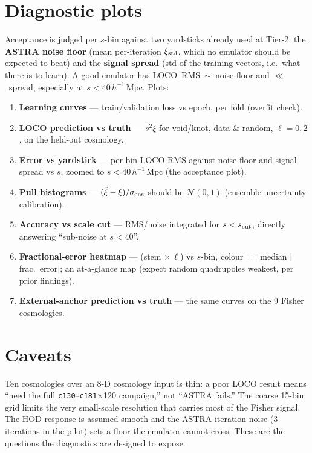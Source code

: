 \documentclass[11pt]{article}
\newcommand{\Mpch}{\,h^{-1}\,\mathrm{Mpc}}
\newcommand{\code}[1]{\texttt{#1}}
\begin{document}
\section{Diagnostic plots}
Acceptance is judged per $s$-bin against two yardsticks already used at Tier-2:
the \textbf{ASTRA noise floor} (mean per-iteration $\xi_{\rm std}$, which no
emulator should be expected to beat) and the \textbf{signal spread} (std of the
training vectors, i.e.\ what there is to learn). A good emulator has
LOCO~RMS~$\sim$~noise floor and $\ll$~spread, especially at $s<40\Mpch$. Plots:
\begin{enumerate}
\item \textbf{Learning curves} --- train/validation loss vs epoch, per fold (overfit check).
\item \textbf{LOCO prediction vs truth} --- $s^2\xi$ for void/knot, data \& random,
  $\ell=0,2$, on the held-out cosmology.
\item \textbf{Error vs yardstick} --- per-bin LOCO RMS against noise floor and
  signal spread vs $s$, zoomed to $s<40\Mpch$ (the acceptance plot).
\item \textbf{Pull histograms} --- $(\hat\xi-\xi)/\sigma_{\rm ens}$ should be
  $\mathcal N(0,1)$ (ensemble-uncertainty calibration).
\item \textbf{Accuracy vs scale cut} --- RMS/noise integrated for $s<s_{\rm cut}$,
  directly answering ``sub-noise at $s<40$''.
\item \textbf{Fractional-error heatmap} --- (stem $\times\,\ell$) vs $s$-bin,
  colour $=$ median $|$frac.\ error$|$; an at-a-glance map (expect random
  quadrupoles weakest, per prior findings).
\item \textbf{External-anchor prediction vs truth} --- the same curves on the 9
  Fisher cosmologies.
\end{enumerate}

\section{Caveats}
Ten cosmologies over an 8-D cosmology input is thin: a poor LOCO result means
``need the full \code{c130}--\code{c181}$\times$120 campaign,'' not ``ASTRA
fails.'' The coarse 15-bin grid limits the very small-scale resolution that
carries most of the Fisher signal. The HOD response is assumed smooth and the
ASTRA-iteration noise (3 iterations in the pilot) sets a floor the emulator
cannot cross. These are the questions the diagnostics are designed to expose.
\end{document}
